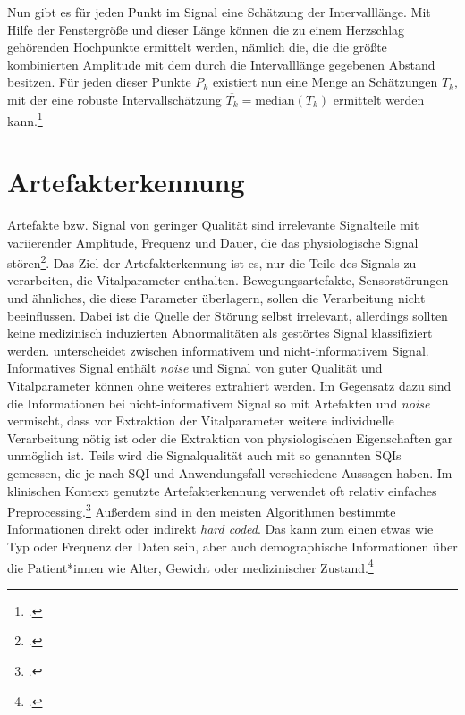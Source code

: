 	Nun gibt es für jeden Punkt im Signal eine Schätzung der Intervalllänge. Mit Hilfe der Fenstergröße und dieser Länge können die zu einem Herzschlag gehörenden Hochpunkte ermittelt werden, nämlich die, die die größte kombinierten Amplitude mit dem durch die Intervalllänge gegebenen Abstand besitzen. Für jeden dieser Punkte $P_k$ existiert nun eine Menge an Schätzungen $T_k$, mit der eine robuste Intervallschätzung $\overline{T_k} = \text{median}(T_k)$ ermittelt werden kann.\footcites[Vgl. zu diesem Kapitel][]{Bruser2013}

\section{Artefakterkennung}
	
	Artefakte bzw. Signal von geringer Qualität sind irrelevante Signalteile mit variierender Amplitude, Frequenz und Dauer, die das physiologische Signal stören\footcite[Vgl.][]{Nizami2013}. Das Ziel der Artefakterkennung ist es, nur die Teile des Signals zu verarbeiten, die Vitalparameter enthalten. Bewegungsartefakte, Sensorstörungen und ähnliches, die diese Parameter überlagern, sollen die Verarbeitung nicht beeinflussen. Dabei ist die Quelle der Störung selbst irrelevant, allerdings sollten keine medizinisch induzierten Abnormalitäten als gestörtes Signal klassifiziert werden. \citeauthor{Sadek2016} unterscheidet zwischen informativem und nicht-informativem Signal. Informatives Signal enthält \textit{noise} und Signal von guter Qualität und Vitalparameter können ohne weiteres extrahiert werden. Im Gegensatz dazu sind die Informationen bei nicht-informativem Signal so mit Artefakten und \textit{noise} vermischt, dass vor Extraktion der Vitalparameter weitere individuelle Verarbeitung nötig ist oder die Extraktion von physiologischen Eigenschaften gar unmöglich ist. Teils wird die Signalqualität auch mit so genannten \acp{SQI} gemessen, die je nach \ac{SQI} und Anwendungsfall verschiedene Aussagen haben. Im klinischen Kontext genutzte Artefakterkennung verwendet oft relativ einfaches Preprocessing.\footcite[Vgl.][]{Nizami2013} Außerdem sind in den meisten Algorithmen bestimmte Informationen direkt oder indirekt \textit{hard coded}. Das kann zum einen etwas wie Typ oder Frequenz der Daten sein, aber auch demographische Informationen über die Patient*innen wie Alter, Gewicht oder medizinischer Zustand.\footcite[Vgl.][]{Nizami2013}
		
